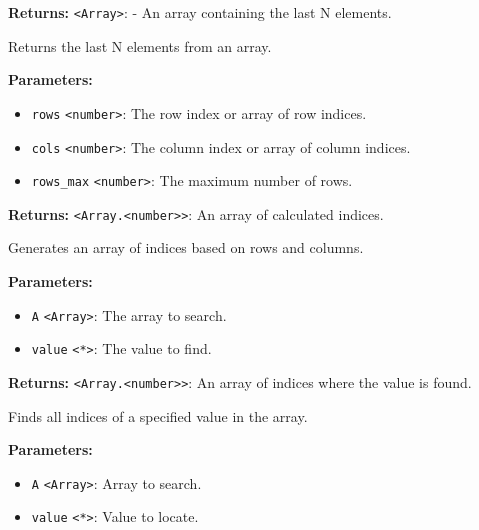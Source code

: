 \documentclass[12pt,a4paper]{article}
\begin{document}
\noindent \textbf{Returns:} \texttt{<Array>}: - An array containing the last N elements.

\noindent Returns the last N elements from an array.

\vspace{5mm}
\noindent {}


\noindent \textbf{Parameters:}
\begin{itemize}
  \item \texttt{rows} \texttt{<number>}: The row index or array of row indices.
  \item \texttt{cols} \texttt{<number>}: The column index or array of column indices.
  \item \texttt{rows\_max} \texttt{<number>}: The maximum number of rows.
\end{itemize}

\noindent \textbf{Returns:} \texttt{<Array.<number>>}: An array of calculated indices.

\noindent Generates an array of indices based on rows and columns.

\vspace{5mm}
\noindent {}


\noindent \textbf{Parameters:}
\begin{itemize}
  \item \texttt{A} \texttt{<Array>}: The array to search.
  \item \texttt{value} \texttt{<*>}: The value to find.
\end{itemize}

\noindent \textbf{Returns:} \texttt{<Array.<number>>}: An array of indices where the value is found.

\noindent Finds all indices of a specified value in the array.

\vspace{5mm}
\noindent {}


\noindent \textbf{Parameters:}
\begin{itemize}
  \item \texttt{A} \texttt{<Array>}: Array to search.
  \item \texttt{value} \texttt{<*>}: Value to locate.
\end{itemize}
\end{document}
